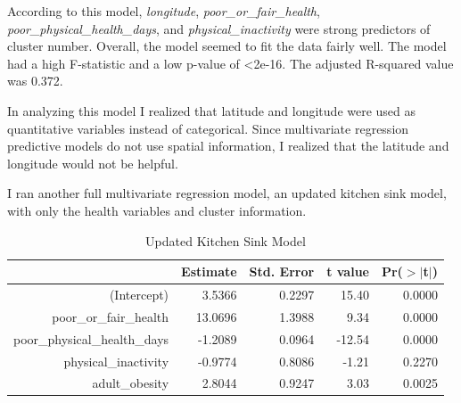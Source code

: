 \documentclass[12pt,twoside]{amherstthesis}
\begin{document}
  According to this model, \emph{longitude},
  \emph{poor\_or\_fair\_health}, \emph{poor\_physical\_health\_days}, and
  \emph{physical\_inactivity} were strong predictors of cluster number.
  Overall, the model seemed to fit the data fairly well. The model had a
  high F-statistic and a low p-value of \textless{}2e-16. The adjusted
  R-squared value was 0.372.
  
  In analyzing this model I realized that latitude and longitude were used
  as quantitative variables instead of categorical. Since multivariate
  regression predictive models do not use spatial information, I realized
  that the latitude and longitude would not be helpful.
  
  \begin{Shaded}
  \end{Shaded}
  
  I ran another full multivariate regression model, an updated kitchen
  sink model, with only the health variables and cluster information.
  
  \begin{Shaded}
  \begin{Highlighting}[]
  \StringTok{ }\OperatorTok{~}
  \end{Highlighting}
  \end{Shaded}
  
  \begin{table}[ht]
  \centering
  \begin{tabular}{rrrrr}
    \hline
   & Estimate & Std. Error & t value & Pr($>$$|$t$|$) \\ 
    \hline
  (Intercept) & 3.5366 & 0.2297 & 15.40 & 0.0000 \\ 
    poor\_or\_fair\_health & 13.0696 & 1.3988 & 9.34 & 0.0000 \\ 
    poor\_physical\_health\_days & -1.2089 & 0.0964 & -12.54 & 0.0000 \\ 
    physical\_inactivity & -0.9774 & 0.8086 & -1.21 & 0.2270 \\ 
    adult\_obesity & 2.8044 & 0.9247 & 3.03 & 0.0025 \\ 
     \hline
  \end{tabular}
  \caption{Updated Kitchen Sink Model} 
  \end{table}
  
\end{document}
